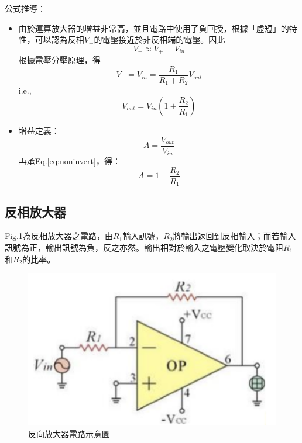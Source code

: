 \documentclass[12pt,a4paper]{article}
\begin{document}
\begin{CJK}{UTF8}{bkai}
公式推導：
\begin{itemize}
    \item 由於運算放大器的增益非常高，並且電路中使用了負回授，根據「虛短」的特性，可以認為反相$V_-$的電壓接近於非反相端的電壓。因此
    \begin{equation}
        V_-\approx V_+ = V_{in}
    \end{equation}
    根據電壓分壓原理，得
    \begin{equation}
        V_-=V_{in}=\frac{R_1}{R_1+R_2}V_{out}
    \end{equation}
    i.e.,
    \begin{equation}
    \label{eq:noninvert}
        V_{out} = V_{in}\left(1+\frac{R_2}{R_1}\right)
    \end{equation}
    \item 增益定義：
    \begin{equation}
        A=\frac{V_{out}}{V_{in}}
    \end{equation}
    再承Eq.\ref{eq:noninvert}，得：
    \begin{equation}
        A=1+\frac{R_2}{R_1}
    \end{equation}
\end{itemize}

\subsection{反相放大器}
\hfill

Fig.\ref{fig:invert}為反相放大器之電路，由$R_1$輸入訊號，$R_2$將輸出返回到反相輸入；而若輸入訊號為正，輸出訊號為負，反之亦然。輸出相對於輸入之電壓變化取決於電阻$R_1$和$R_2$的比率。 

\begin{figure}[h]
    \centering
    \includegraphics[width=0.5\linewidth]{figures/invert.png}
    \caption{反向放大器電路示意圖}
    \label{fig:invert}
\end{figure}



\end{CJK}
\end{document}
